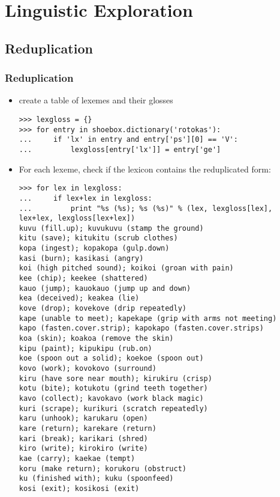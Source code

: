 \documentclass{beamer}
\begin{document}
\section{Linguistic Exploration}

\subsection{Reduplication}

\begin{frame}[fragile]
\frametitle{Reduplication}
\scriptsize
\begin{itemize}
\item create a table of lexemes and their glosses

\begin{verbatim}
>>> lexgloss = {}
>>> for entry in shoebox.dictionary('rotokas'):
...     if 'lx' in entry and entry['ps'][0] == 'V':
...         lexgloss[entry['lx']] = entry['ge']
\end{verbatim}

\item For each lexeme, check if the lexicon contains the reduplicated form:

\begin{verbatim}
>>> for lex in lexgloss:
...     if lex+lex in lexgloss:
...         print "%s (%s); %s (%s)" % (lex, lexgloss[lex], lex+lex, lexgloss[lex+lex])
kuvu (fill.up); kuvukuvu (stamp the ground)
kitu (save); kitukitu (scrub clothes)
kopa (ingest); kopakopa (gulp.down)
kasi (burn); kasikasi (angry)
koi (high pitched sound); koikoi (groan with pain)
kee (chip); keekee (shattered)
kauo (jump); kauokauo (jump up and down)
kea (deceived); keakea (lie)
kove (drop); kovekove (drip repeatedly)
kape (unable to meet); kapekape (grip with arms not meeting)
kapo (fasten.cover.strip); kapokapo (fasten.cover.strips)
koa (skin); koakoa (remove the skin)
kipu (paint); kipukipu (rub.on)
koe (spoon out a solid); koekoe (spoon out)
kovo (work); kovokovo (surround)
kiru (have sore near mouth); kirukiru (crisp)
kotu (bite); kotukotu (grind teeth together)
kavo (collect); kavokavo (work black magic)
kuri (scrape); kurikuri (scratch repeatedly)
karu (unhook); karukaru (open)
kare (return); karekare (return)
kari (break); karikari (shred)
kiro (write); kirokiro (write)
kae (carry); kaekae (tempt)
koru (make return); korukoru (obstruct)
ku (finished with); kuku (spoonfeed)
kosi (exit); kosikosi (exit)
\end{verbatim}
\end{itemize}
\end{frame}
\end{document}
